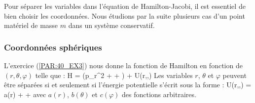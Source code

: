 Pour s\'{e}parer les variables dans l'\'{e}quation de Hamilton-Jacobi, il est essentiel de bien choisir les coordonn\'{e}es. Nous \'{e}tudions par la suite plusieurs cas d'un point mat\'{e}riel de masse $m$ dans un syst\`{e}me conservatif.

\subsubsection{Coordonn\'{e}es sph\'{e}riques}\label{PAR:48_3_1}

L'exercice (\ref{PAR:40_EX3}) nous donne la fonction de Hamilton en fonction de $(r,\theta,\varphi)$ telle que :
\benn
	H = \left(p_{r}^{2} +  + \right) + U(r,\theta,\varphi)
\eenn
Les variables $r$, $\theta$ et $\varphi$ peuvent \^{e}tre s\'{e}par\'{e}es si et seulement si l'\'{e}nergie potentielle s'\'{e}crit sous la forme :
\benn
	U(r,\theta,\varphi) = a(r) +  + 
\eenn
avec $a(r)$, $b(\theta)$ et $c(\varphi)$ des fonctions arbitraires.

